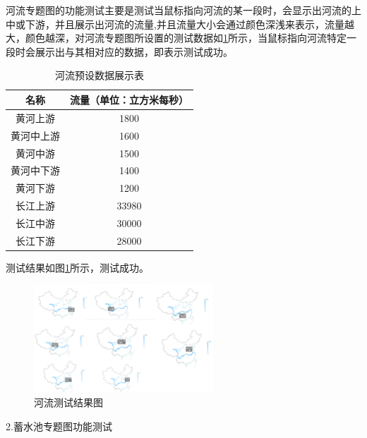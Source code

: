 河流专题图的功能测试主要是测试当鼠标指向河流的某一段时，会显示出河流的上中或下游，并且展示出河流的流量,并且流量大小会通过颜色深浅来表示，流量越大，颜色越深，对河流专题图所设置的测试数据如\ref{heliu}所示，当鼠标指向河流特定一段时会展示出与其相对应的数据，即表示测试成功。
\begin{table}[H]
	\centering
	\caption[河流数据]{河流预设数据展示表}
	\label{heliu}
	\begin{tabular}{cc}
		\toprule
		名称           & 流量（单位：立方米每秒）     \\
		\midrule
		黄河上游         & 1800 \\
		黄河中上游     & 1600   \\
		黄河中游      & 1500      \\
		黄河中下游      & 1400    \\
		黄河下游 & 1200      \\
		长江上游 & 33980      \\
		长江中游       & 30000    \\
		长江下游  & 28000      \\
		\bottomrule
	\end{tabular}
\end{table}
测试结果如图\ref{fig:ceshiheliu}所示，测试成功。
\begin{figure}[!htb]%
	\centering
	\includegraphics[width=0.60\textwidth]{figs/ceshiheliu.png}
	\caption{河流测试结果图}
	\label{fig:ceshiheliu}
\end{figure}

2.蓄水池专题图功能测试


